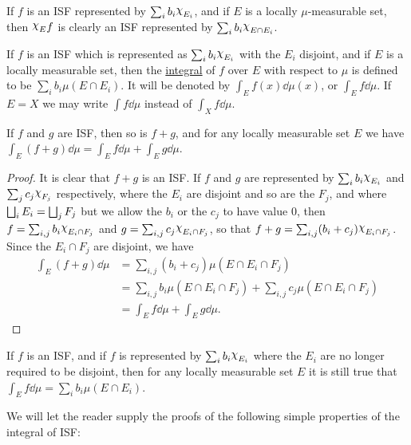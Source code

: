 If $f$ is an ISF represented by $\sum_ib_i\idf{E_i}$, and if $E$ is a locally $\mu$-measurable set, then $\idf{E}f$ is clearly an ISF represented by $\sum_ib_i\idf{E\cap E_i}$.

\begin{definition}
If $f$ is an ISF which is represented as $\sum_i b_i\idf{E_i}$ with the $E_i$ disjoint, and if $E$ is a locally measurable set, then the \underline{integral} of $f$ over $E$ with respect to $\mu$ is defined to be $\sum_ib_i \mu(E \cap E_i)$. It will be denoted by $\int_Ef(x)\dd\mu(x)$, or $\int_Ef\dd\mu$. If $E=X$ we may write $\int f\dd\mu$ instead of $\int_Xf\dd\mu$.
\end{definition}

\begin{lemma}
\label{lem:linearity of ISF integral}
If $f$ and $g$ are ISF, then so is $f+g$, and for any locally measurable set $E$ we have $\int_E(f+g)\dd\mu=\int_Ef\dd\mu+\int_Eg\dd\mu$.
\end{lemma}

\begin{proof}
It is clear that $f+g$ is an ISF. If $f$ and $g$ are represented by $\sum_ib_i\idf{E_i}$ and $\sum_jc_j\idf{F_j}$ respectively, where the $E_i$ are disjoint and so are the $F_j$, and where $\bigsqcup_iE_i=\bigsqcup_jF_j$ but we allow the $b_i$ or the $c_j$ to have value 0, then $f=\sum_{i, j}b_i\idf{E_i\cap F_j}$ and $g=\sum_{i, j}c_j \idf{E_i\cap F_j}$, so that $f+g=\sum_{i, j}(b_i+c_j)\idf{E_i\cap F_j}$. Since the $E_i \cap F_j$ are disjoint, we have
\begin{align*}
    \int_E(f+g)\dd\mu&=\sum_{i,j}(b_i+c_j)\mu(E\cap E_i\cap F_j)\\
    &=\sum_{i,j}b_i\mu(E \cap E_i \cap F_j)+\sum_{i,j}c_j\mu(E\cap E_i\cap F_j)\\
    &=\int_Ef\dd\mu+\int_Eg\dd\mu.
\end{align*}
\end{proof}

\begin{corollary}
If $f$ is an ISF, and if $f$ is represented by $\sum_ib_i\idf{E_i}$ where the $E_i$ are no longer required to be disjoint, then for any locally measurable set $E$ it is still true that $\int_Ef\dd\mu=\sum_ib_i\mu(E\cap E_i)$.
\end{corollary}

We will let the reader supply the proofs of the following simple properties of the integral of ISF:

